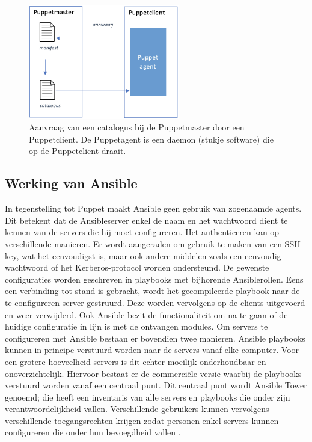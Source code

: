 \begin{figure}  \begin{center}
  \includegraphics[width=250px]{img/aanvraagCatalogus.png}
 \end{center}\caption{Aanvraag van een catalogus bij de Puppetmaster door een Puppetclient. De Puppetagent is een daemon (stukje software) die op de Puppetclient draait.}  
  \label{fig:aanvraagCatalogus}
\end{figure}


\subsection{Werking van Ansible}

In tegenstelling tot Puppet maakt Ansible geen gebruik van zogenaamde agents. Dit betekent dat de Ansibleserver enkel de naam en het wachtwoord dient te kennen van de servers die hij moet configureren. Het authenticeren kan op verschillende manieren. Er wordt aangeraden om gebruik te maken van een SSH-key, wat het eenvoudigst is, maar ook andere middelen zoals een eenvoudig wachtwoord of het Kerberos-protocol worden ondersteund. De gewenste configuraties worden geschreven in playbooks met bijhorende Ansiblerollen. Eens een verbinding tot stand is gebracht, wordt het gecompileerde playbook naar de te configureren server gestruurd. Deze worden vervolgens op de clients uitgevoerd  en weer verwijderd. Ook Ansible bezit de functionaliteit om na te gaan of de huidige configuratie in lijn is met de ontvangen modules. Om servers te configureren met Ansible bestaan er bovendien twee manieren. Ansible playbooks kunnen in principe verstuurd worden naar de servers vanaf elke computer. Voor een grotere hoeveelheid servers is dit echter moeilijk onderhoudbaar en onoverzichtelijk. Hiervoor bestaat er de commerci\"ele versie waarbij de playbooks verstuurd worden vanaf een centraal punt. Dit centraal punt wordt Ansible Tower genoemd; die heeft een inventaris van alle servers en playbooks die onder zijn verantwoordelijkheid vallen. Verschillende gebruikers kunnen vervolgens verschillende toegangsrechten krijgen zodat personen enkel servers kunnen configureren die onder hun bevoegdheid vallen \autocite{ansibledoc}.

